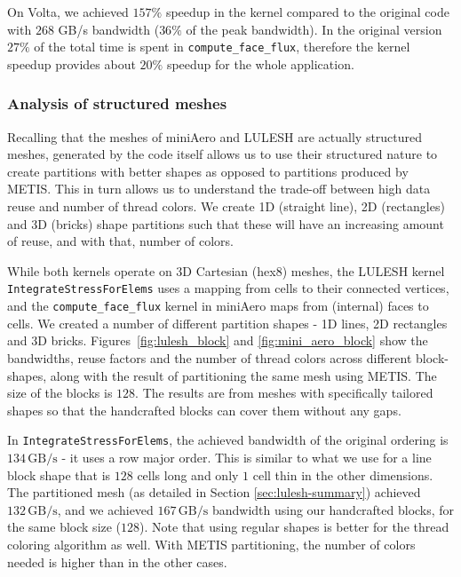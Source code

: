 On Volta, we achieved $157\%$ speedup in the kernel compared to the
original code with $268$ GB/s bandwidth ($36\%$ of the peak bandwidth). In the
original version $27\%$ of the total time is spent 
in \texttt{compute\_face\_flux}, therefore the kernel speedup provides about
$20\%$ speedup for the whole application.




\subsubsection{Analysis of structured meshes}

Recalling that the meshes of miniAero and LULESH are actually structured 
meshes, generated by the code itself allows us to use their structured 
nature to create partitions with better shapes as opposed to partitions 
produced by METIS. This in turn allows us to understand the trade-off between
high data reuse and number of thread colors.  We create 1D (straight line), 2D 
(rectangles) and 3D (bricks) shape partitions such that these will have an 
increasing amount of reuse, and with that, number  of colors. 

While both kernels operate on 3D Cartesian (hex8) meshes, the LULESH kernel 
\texttt{IntegrateStressForElems} uses a mapping from cells to their connected 
vertices, and the \texttt{compute\_face\_flux} kernel in miniAero maps from 
(internal) faces to cells. We created a number of different partition shapes - 
1D lines, 2D rectangles and 3D bricks. Figures~\ref{fig:lulesh_block} and 
\ref{fig:mini_aero_block} show the bandwidths, reuse factors and the number of 
thread colors across different block-shapes, along with the result of 
partitioning the same mesh using METIS. The size of the blocks is $128$. The 
results are from meshes with specifically tailored shapes so that the 
handcrafted blocks can cover them without any gaps. 

In \texttt{IntegrateStressForElems}, the achieved bandwidth of the 
original ordering is $134\,\text{GB/s}$ - it uses a row major order. This is 
similar to what we use for a line block shape that is $128$ cells long and only $1$ 
cell thin in the other dimensions. The partitioned mesh (as detailed in Section 
\ref{sec:lulesh-summary}) achieved $132\,\text{GB/s}$, and we achieved 
$167\,\text{GB/s}$ bandwidth using our handcrafted blocks, for the same block 
size ($128$). Note that using regular shapes is better for the thread coloring 
algorithm as well. With METIS partitioning, the number of colors needed 
is higher than in the other cases.

